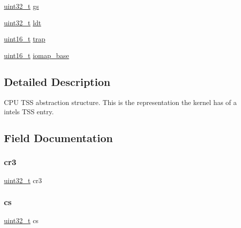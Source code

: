 \begin{DoxyCompactItemize}
\item 
\hyperlink{stdint_8h_a324c5d28c0d82f502a234ab99efac87a}{uint32\+\_\+t} \hyperlink{structcpu__tss__entry_a85904ecbf7b717abe738645b4ff2f4ff}{gs}
\item 
\hyperlink{stdint_8h_a324c5d28c0d82f502a234ab99efac87a}{uint32\+\_\+t} \hyperlink{structcpu__tss__entry_aa12b05931ab0b08974e1e8bf627c8790}{ldt}
\item 
\hyperlink{stdint_8h_a273cf69d639a59973b6019625df33e30}{uint16\+\_\+t} \hyperlink{structcpu__tss__entry_a9375f4a9360efc8d2a1805b676967567}{trap}
\item 
\hyperlink{stdint_8h_a273cf69d639a59973b6019625df33e30}{uint16\+\_\+t} \hyperlink{structcpu__tss__entry_aa1e0bbc09ee0c9741324f810edee3ba8}{iomap\+\_\+base}
\end{DoxyCompactItemize}


\subsection{Detailed Description}
C\+PU T\+SS abstraction structure. This is the representation the kernel has of a intel\textquotesingle{}s T\+SS entry. 

\subsection{Field Documentation}
\mbox{\label{structcpu__tss__entry_aa9166a91c5e8b2b51b0a9677f9ba56a0}} 
\subsubsection{\texorpdfstring{cr3}{cr3}}
{\footnotesize\ttfamily \hyperlink{stdint_8h_a324c5d28c0d82f502a234ab99efac87a}{uint32\+\_\+t} cr3}

\mbox{\label{structcpu__tss__entry_a8519dc239502dfcbac171b3128dc7054}} 
\subsubsection{\texorpdfstring{cs}{cs}}
{\footnotesize\ttfamily \hyperlink{stdint_8h_a324c5d28c0d82f502a234ab99efac87a}{uint32\+\_\+t} cs}

